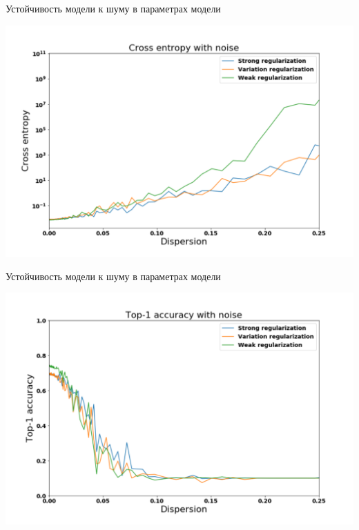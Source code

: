 \documentclass[10pt]{beamer}
\begin{document}
\begin{frame}{Устойчивость модели к шуму в параметрах модели}

\centering
\includegraphics[width=1\linewidth]{slides_ce_noise_params_graph.pdf}
\caption{}
\label{}

\end{frame}

\begin{frame}{Устойчивость модели к шуму в параметрах модели}

\centering
\includegraphics[width=1\linewidth]{slides_t1_noise_params_graph.pdf}
\caption{}
\label{}

\end{frame}
\end{document}
